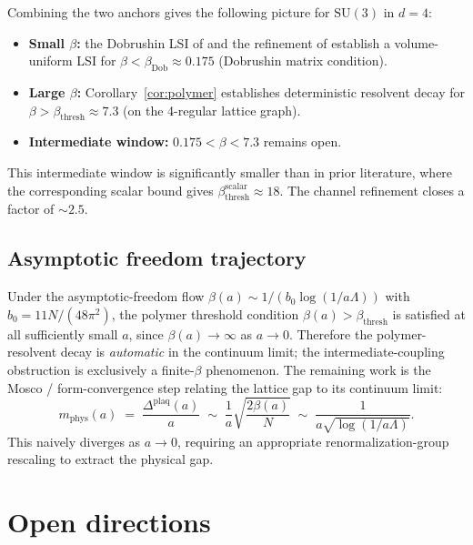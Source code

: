 \documentclass[11pt,a4paper]{article}
\theoremstyle{definition}
\newcommand{\SU}{\mathrm{SU}}
\newcommand{\Gap}{{\Delta^{\mathrm{plaq}}}}
\begin{document}
Combining the two anchors gives the following picture for $\SU(3)$
in $d = 4$:
\begin{itemize}
\item\textbf{Small $\beta$:} the Dobrushin LSI of
\cite{ShenZhuZhu2023} and the refinement of
\cite{CaoNissimSheffield2025} establish a volume-uniform LSI for
$\beta < \beta_{\mathrm{Dob}} \approx 0.175$ (Dobrushin matrix
condition).

\item\textbf{Large $\beta$:} Corollary~\ref{cor:polymer} establishes
deterministic resolvent decay for
$\beta > \beta_{\mathrm{thresh}} \approx 7.3$ (on the 4-regular
lattice graph).

\item\textbf{Intermediate window:} $0.175 < \beta < 7.3$ remains open.
\end{itemize}

This intermediate window is significantly smaller than in prior
literature, where the corresponding scalar bound gives
$\beta_{\mathrm{thresh}}^{\mathrm{scalar}} \approx 18$. The channel
refinement closes a factor of $\sim 2.5$.

\subsection{Asymptotic freedom trajectory}

Under the asymptotic-freedom flow
$\beta(a) \sim 1/(b_0\log(1/a\Lambda))$ with $b_0 = 11N/(48\pi^2)$,
the polymer threshold condition $\beta(a) > \beta_{\mathrm{thresh}}$
is satisfied at all sufficiently small $a$, since
$\beta(a)\to\infty$ as $a\to 0$. Therefore the polymer-resolvent
decay is \emph{automatic} in the continuum limit; the
intermediate-coupling obstruction is exclusively a finite-$\beta$
phenomenon. The remaining work is the Mosco / form-convergence step
relating the lattice gap to its continuum limit:
\[
m_{\mathrm{phys}}(a) \;=\; \frac{\Gap(a)}{a}
\;\sim\;
\frac{1}{a}\sqrt{\frac{2\beta(a)}{N}}
\;\sim\;
\frac{1}{a\sqrt{\log(1/a\Lambda)}}.
\]
This naively diverges as $a\to 0$, requiring an appropriate
renormalization-group rescaling to extract the physical gap.

\section{Open directions}
\end{document}
